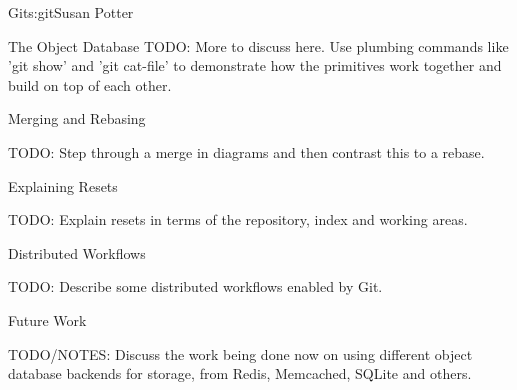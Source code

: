 \begin{aosachapter}{Git}{s:git}{Susan Potter}
\begin{aosasect1}{The Object Database}
TODO: More to discuss here. Use plumbing commands like 'git show' and 'git
cat-file' to demonstrate how the primitives work together and build on top of
each other.

\end{aosasect1}

\begin{aosasect1}{Merging and Rebasing}

TODO: Step through a merge in diagrams and then contrast this to a rebase.

\end{aosasect1}

\begin{aosasect1}{Explaining Resets}

TODO: Explain resets in terms of the repository, index and working areas.

\end{aosasect1}

\begin{aosasect1}{Distributed Workflows}

TODO: Describe some distributed workflows enabled by Git.

\end{aosasect1}

\begin{aosasect1}{Future Work}

TODO/NOTES:
Discuss the work being done now on using different object database backends
for storage, from Redis, Memcached, SQLite and others.

\end{aosasect1}

\end{aosachapter}
